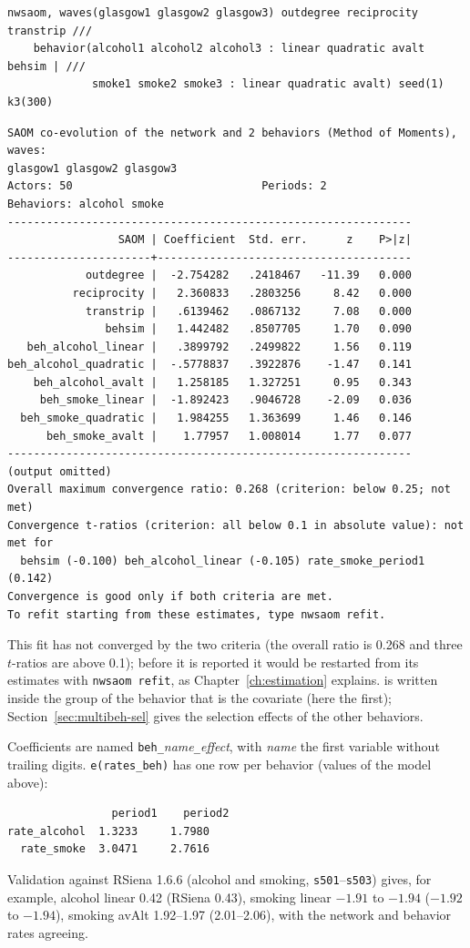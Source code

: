 \begin{lstlisting}
nwsaom, waves(glasgow1 glasgow2 glasgow3) outdegree reciprocity transtrip ///
    behavior(alcohol1 alcohol2 alcohol3 : linear quadratic avalt behsim | ///
             smoke1 smoke2 smoke3 : linear quadratic avalt) seed(1) k3(300)
\end{lstlisting}
\begin{lstlisting}
SAOM co-evolution of the network and 2 behaviors (Method of Moments), waves:
glasgow1 glasgow2 glasgow3
Actors: 50                             Periods: 2
Behaviors: alcohol smoke
--------------------------------------------------------------
                 SAOM | Coefficient  Std. err.      z    P>|z|
----------------------+---------------------------------------
            outdegree |  -2.754282   .2418467   -11.39   0.000
          reciprocity |   2.360833   .2803256     8.42   0.000
            transtrip |   .6139462   .0867132     7.08   0.000
               behsim |   1.442482   .8507705     1.70   0.090
   beh_alcohol_linear |   .3899792   .2499822     1.56   0.119
beh_alcohol_quadratic |  -.5778837   .3922876    -1.47   0.141
    beh_alcohol_avalt |   1.258185   1.327251     0.95   0.343
     beh_smoke_linear |  -1.892423   .9046728    -2.09   0.036
  beh_smoke_quadratic |   1.984255   1.363699     1.46   0.146
      beh_smoke_avalt |    1.77957   1.008014     1.77   0.077
--------------------------------------------------------------
(output omitted)
Overall maximum convergence ratio: 0.268 (criterion: below 0.25; not met)
Convergence t-ratios (criterion: all below 0.1 in absolute value): not met for
  behsim (-0.100) beh_alcohol_linear (-0.105) rate_smoke_period1 (0.142)
Convergence is good only if both criteria are met.
To refit starting from these estimates, type nwsaom refit.
\end{lstlisting}
This fit has not converged by the two criteria (the overall ratio is 0.268 and three $t$-ratios are above 0.1); before it is reported it would be restarted from its estimates with \texttt{nwsaom refit}, as Chapter~\ref{ch:estimation} explains.  is written inside the group of the behavior that is the covariate (here the first); Section~\ref{sec:multibeh-sel} gives the selection effects of the other behaviors.

Coefficients are named \texttt{beh\_}\emph{name}\texttt{\_}\emph{effect}, with \emph{name} the first variable without trailing digits. \texttt{e(rates\_beh)} has one row per behavior (values of the model above):
\begin{lstlisting}
                period1    period2
rate_alcohol  1.3233     1.7980
  rate_smoke  3.0471     2.7616
\end{lstlisting}
Validation against RSiena 1.6.6 (alcohol and smoking, \texttt{s501}--\texttt{s503}) gives, for example, alcohol linear 0.42 (RSiena 0.43), smoking linear $-1.91$ to $-1.94$ ($-1.92$ to $-1.94$), smoking avAlt 1.92--1.97 (2.01--2.06), with the network and behavior rates agreeing.

